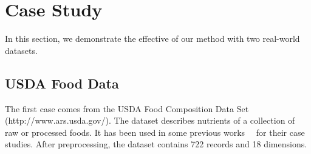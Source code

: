 \section{Case Study}
In this section, we demonstrate the effective of our method with two real-world datasets.

\subsection{USDA Food Data}
The first case comes from the USDA Food Composition Data Set (http://www.ars.usda.gov/).  The dataset describes nutrients of a collection of raw or processed foods. It has been used in some previous works~\cite{DBLP:conf/ieeevast/TatuMFBSSK12}~\cite{DBLP:journals/tvcg/YuanRWG13} for their case studies. After preprocessing, the dataset contains 722 records and 18 dimensions.

\label{section:casestudy}